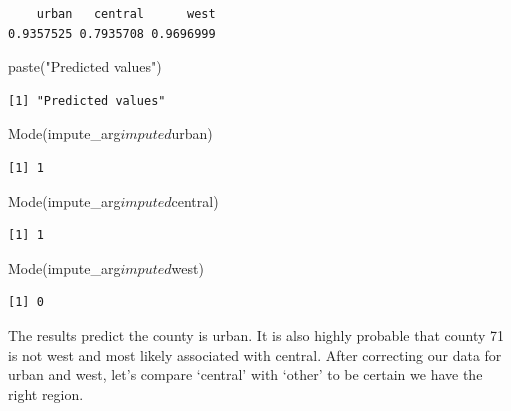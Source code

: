 \documentclass[]{article}
\newenvironment{Shaded}{}{}
\newcommand{\KeywordTok}[1]{\textcolor[rgb]{0.00,0.00,1.00}{#1}}
\newcommand{\NormalTok}[1]{#1}
\newcommand{\OperatorTok}[1]{#1}
\newcommand{\StringTok}[1]{\textcolor[rgb]{0.00,0.50,0.50}{#1}}
\begin{document}
\begin{verbatim}
    urban   central      west 
0.9357525 0.7935708 0.9696999 
\end{verbatim}

\begin{Shaded}
\begin{Highlighting}[]
\KeywordTok{paste}\NormalTok{(}\StringTok{"Predicted values"}\NormalTok{)}
\end{Highlighting}
\end{Shaded}

\begin{verbatim}
[1] "Predicted values"
\end{verbatim}

\begin{Shaded}
\begin{Highlighting}[]
\KeywordTok{Mode}\NormalTok{(impute_arg}\OperatorTok{$}\NormalTok{imputed}\OperatorTok{$}\NormalTok{urban)}
\end{Highlighting}
\end{Shaded}

\begin{verbatim}
[1] 1
\end{verbatim}

\begin{Shaded}
\begin{Highlighting}[]
\KeywordTok{Mode}\NormalTok{(impute_arg}\OperatorTok{$}\NormalTok{imputed}\OperatorTok{$}\NormalTok{central)}
\end{Highlighting}
\end{Shaded}

\begin{verbatim}
[1] 1
\end{verbatim}

\begin{Shaded}
\begin{Highlighting}[]
\KeywordTok{Mode}\NormalTok{(impute_arg}\OperatorTok{$}\NormalTok{imputed}\OperatorTok{$}\NormalTok{west)}
\end{Highlighting}
\end{Shaded}

\begin{verbatim}
[1] 0
\end{verbatim}

The results predict the county is urban. It is also highly probable that
county 71 is not west and most likely associated with central. After
correcting our data for urban and west, let's compare `central' with
`other' to be certain we have the right region.
\end{document}
